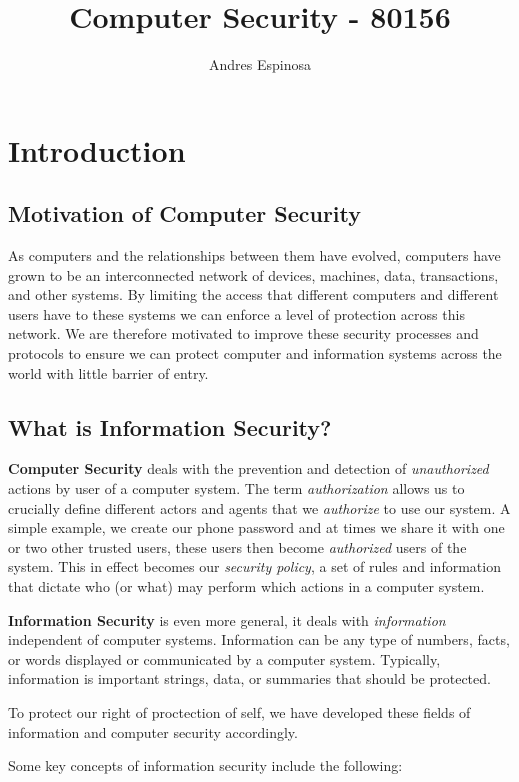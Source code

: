 \documentclass[11pt]{article}
\title{Computer Security - 80156}
\author{Andres Espinosa}
\begin{document}
\pgfplotsset{compat=1.18}
\maketitle

\tableofcontents

\section{Introduction}
\subsection{Motivation of Computer Security}
As computers and the relationships between them have evolved, computers have grown to be an interconnected network of devices, machines, data, transactions, and other systems.
By limiting the access that different computers and different users have to these systems we can enforce a level of protection across this network.
We are therefore motivated to improve these security processes and protocols to ensure we can protect computer and information systems across the world with little barrier of entry.

\subsection{What is Information Security?}
\textbf{Computer Security} deals with the prevention and detection of \textit{unauthorized} actions by user of a computer system.
The term \textit{authorization} allows us to crucially define different actors and agents that we \textit{authorize} to use our system.
A simple example, we create our phone password and at times we share it with one or two other trusted users, these users then become \textit{authorized} users of the system.
This in effect becomes our \textit{security policy}, a set of rules and information that dictate who (or what) may perform which actions in a computer system.

\textbf{Information Security} is even more general, it deals with \textit{information} independent of computer systems.
Information can be any type of numbers, facts, or words displayed or communicated by a computer system.
Typically, information is important strings, data, or summaries that should be protected. 

To protect our right of proctection of self, we have developed these fields of information and computer security accordingly.

Some key concepts of information security include the following:
\end{document}
